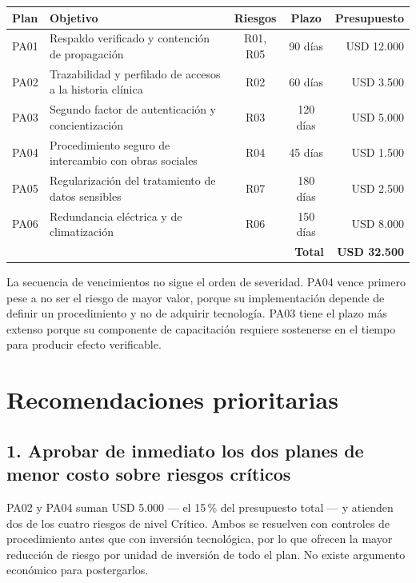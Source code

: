 \documentclass[10pt,a4paper]{article}
\begin{document}
\begin{center}
\renewcommand{\arraystretch}{1.3}
\begin{tabular}{@{}l>{\raggedright\arraybackslash}p{5.6cm}ccr@{}}
\toprule
\textbf{Plan} & \textbf{Objetivo} & \textbf{Riesgos} & \textbf{Plazo} & \textbf{Presupuesto} \\
\midrule
PA01 & Respaldo verificado y contención de propagación & R01, R05 & 90 días & USD 12.000 \\
PA02 & Trazabilidad y perfilado de accesos a la historia clínica & R02 & 60 días & USD 3.500 \\
PA03 & Segundo factor de autenticación y concientización & R03 & 120 días & USD 5.000 \\
PA04 & Procedimiento seguro de intercambio con obras sociales & R04 & 45 días & USD 1.500 \\
PA05 & Regularización del tratamiento de datos sensibles & R07 & 180 días & USD 2.500 \\
PA06 & Redundancia eléctrica y de climatización & R06 & 150 días & USD 8.000 \\
\midrule
\multicolumn{4}{r}{\textbf{Total}} & \textbf{USD 32.500} \\
\bottomrule
\end{tabular}
\end{center}

La secuencia de vencimientos no sigue el orden de severidad. PA04 vence primero
pese a no ser el riesgo de mayor valor, porque su implementación depende de
definir un procedimiento y no de adquirir tecnología. PA03 tiene el plazo más
extenso porque su componente de capacitación requiere sostenerse en el tiempo
para producir efecto verificable.

\section{Recomendaciones prioritarias}

\subsection*{1. Aprobar de inmediato los dos planes de menor costo sobre riesgos críticos}

PA02 y PA04 suman USD 5.000 --- el 15\,\% del presupuesto total --- y atienden
dos de los cuatro riesgos de nivel Crítico. Ambos se resuelven con controles de
procedimiento antes que con inversión tecnológica, por lo que ofrecen la mayor
reducción de riesgo por unidad de inversión de todo el plan. No existe argumento
económico para postergarlos.
\end{document}
